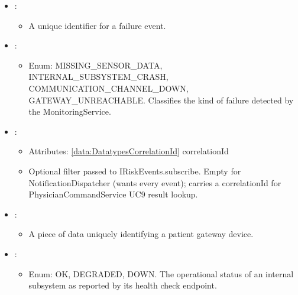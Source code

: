 \begin{itemize}[nolistsep,noitemsep]
\item {}: 
\begin{itemize}[noitemsep,nolistsep]

\item[] A unique identifier for a failure event.
\end{itemize}

\item {}: 
\begin{itemize}[noitemsep,nolistsep]

\item[] Enum: MISSING\_SENSOR\_DATA, INTERNAL\_SUBSYSTEM\_CRASH, 
        COMMUNICATION\_CHANNEL\_DOWN, GATEWAY\_UNREACHABLE.
  Classifies the kind of failure detected by the MonitoringService.
\end{itemize}

\item {}: 
\begin{itemize}[noitemsep,nolistsep]
\item[] Attributes: \ref{data:DatatypesCorrelationId} correlationId
\item[] Optional filter passed to IRiskEvents.subscribe. Empty for NotificationDispatcher (wants every event); carries a correlationId for PhysicianCommandService UC9 result lookup.
\end{itemize}

\item {}: 
\begin{itemize}[noitemsep,nolistsep]

\item[] A piece of data uniquely identifying a patient gateway device. 
\end{itemize}

\item {}: 
\begin{itemize}[noitemsep,nolistsep]

\item[] Enum: OK, DEGRADED, DOWN.
  The operational status of an internal subsystem as reported 
  by its health check endpoint.
\end{itemize}


\end{itemize}
